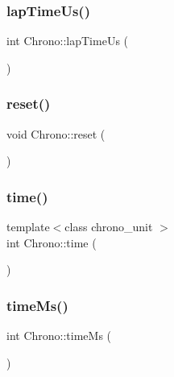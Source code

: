 \mbox{\label{class_chrono_ab5ef782998bb0c75ecf7cf43db8ce8a0}} 
\subsubsection{\texorpdfstring{lap\+Time\+Us()}{lapTimeUs()}}
{\footnotesize\ttfamily int Chrono\+::lap\+Time\+Us (\begin{DoxyParamCaption}{ }\end{DoxyParamCaption})\hspace{0.3cm}{\ttfamily [inline]}}

\mbox{\label{class_chrono_a027be23720616639bc610a98c53740ea}} 
\subsubsection{\texorpdfstring{reset()}{reset()}}
{\footnotesize\ttfamily void Chrono\+::reset (\begin{DoxyParamCaption}{ }\end{DoxyParamCaption})\hspace{0.3cm}{\ttfamily [inline]}}

\mbox{\label{class_chrono_a224beb8f4bebc02d2a12dcf29ba6e5c9}} 
\subsubsection{\texorpdfstring{time()}{time()}}
{\footnotesize\ttfamily template$<$class chrono\+\_\+unit $>$ \\
int Chrono\+::time (\begin{DoxyParamCaption}{ }\end{DoxyParamCaption})\hspace{0.3cm}{\ttfamily [inline]}}

\mbox{\label{class_chrono_a823638d3248d0cdd9f01ef6c840ad1d2}} 
\subsubsection{\texorpdfstring{time\+Ms()}{timeMs()}}
{\footnotesize\ttfamily int Chrono\+::time\+Ms (\begin{DoxyParamCaption}{ }\end{DoxyParamCaption})\hspace{0.3cm}{\ttfamily [inline]}}

